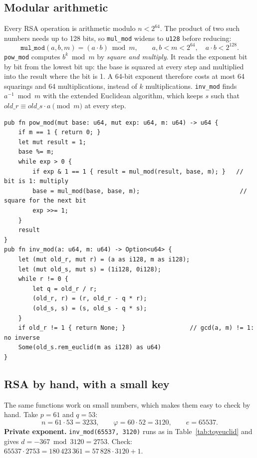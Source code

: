 \subsection{Modular arithmetic}

Every RSA operation is arithmetic modulo $n < 2^{64}$. The product of two such
numbers needs up to 128 bits, so \texttt{mul\_mod} widens to \texttt{u128}
before reducing:
\[
  \texttt{mul\_mod}(a, b, m) = (a \cdot b) \bmod m, \qquad a, b < m < 2^{64}, \quad a \cdot b < 2^{128}.
\]
\texttt{pow\_mod} computes $b^{k} \bmod m$ by \emph{square and multiply}. It
reads the exponent bit by bit from the lowest bit up: the base is squared at
every step and multiplied into the result where the bit is 1. A 64-bit exponent
therefore costs at most 64 squarings and 64 multiplications, instead of $k$
multiplications. \texttt{inv\_mod} finds $a^{-1} \bmod m$ with the extended
Euclidean algorithm, which keeps $s$ such that $\mathit{old\_r} \equiv
\mathit{old\_s} \cdot a \pmod m$ at every step.

\begin{lstlisting}[caption={Square and multiply, and the modular inverse (\texttt{math.rs}).}]
pub fn pow_mod(mut base: u64, mut exp: u64, m: u64) -> u64 {
    if m == 1 { return 0; }
    let mut result = 1;
    base %= m;
    while exp > 0 {
        if exp & 1 == 1 { result = mul_mod(result, base, m); }   // bit is 1: multiply
        base = mul_mod(base, base, m);                            // square for the next bit
        exp >>= 1;
    }
    result
}
pub fn inv_mod(a: u64, m: u64) -> Option<u64> {
    let (mut old_r, mut r) = (a as i128, m as i128);
    let (mut old_s, mut s) = (1i128, 0i128);
    while r != 0 {
        let q = old_r / r;
        (old_r, r) = (r, old_r - q * r);
        (old_s, s) = (s, old_s - q * s);
    }
    if old_r != 1 { return None; }                  // gcd(a, m) != 1: no inverse
    Some(old_s.rem_euclid(m as i128) as u64)
}
\end{lstlisting}

\subsection{RSA by hand, with a small key}

The same functions work on small numbers, which makes them easy to check by
hand. Take $p = 61$ and $q = 53$:
\[
  n = 61 \cdot 53 = 3233, \qquad \varphi = 60 \cdot 52 = 3120, \qquad e = 65537 .
\]
\textbf{Private exponent.} \texttt{inv\_mod(65537, 3120)} runs as in
Table~\ref{tab:toyeuclid} and gives $d = -367 \bmod 3120 = 2753$. Check:
$65537 \cdot 2753 = 180\,423\,361 = 57\,828 \cdot 3120 + 1$.

